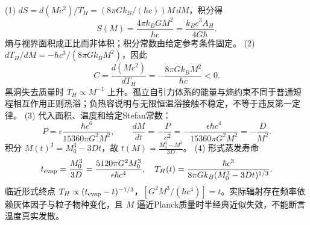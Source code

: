 (1) \(dS=d(Mc^2)/T_H=(8\pi Gk_B/(\hbar c))M\,dM\)，积分得
\[
S(M)=\frac{4\pi k_BG M^2}{\hbar c}
=\frac{k_Bc^3A_H}{4G\hbar}.
\]
熵与视界面积成正比而非体积；积分常数由给定参考条件固定。
(2) \(dT_H/dM=-\hbar c^3/(8\pi Gk_BM^2)\)，因此
\[
C=\frac{d(Mc^2)}{dT_H}=-\frac{8\pi Gk_BM^2}{\hbar c}<0.
\]
黑洞失去质量时 \(T_H\propto M^{-1}\) 上升。孤立自引力体系的能量与熵约束不同于普通短程相互作用正则热浴；负热容说明与无限恒温浴接触不稳定，不等于违反第一定律。
(3) 代入面积、温度和给定Stefan常数：
\[
P=\epsilon\frac{\hbar c^6}{15360\pi G^2M^2},\qquad
\frac{dM}{dt}=-\frac{P}{c^2}=-\frac{\epsilon\hbar c^4}{15360\pi G^2M^2}=-\frac{D}{M^2}.
\]
积分 \(M(t)^3=M_0^3-3Dt\)，故 \(t(M)=\frac{M_0^3-M^3}{3D}\)。
(4) 形式蒸发寿命
\[
t_{\rm evap}=\frac{M_0^3}{3D}=\frac{5120\pi G^2M_0^3}{\epsilon\hbar c^4},
\quad T_H(t)=\frac{\hbar c^3}{8\pi Gk_B(M_0^3-3Dt)^{1/3}}.
\]
临近形式终点 \(T_H\propto(t_{\rm evap}-t)^{-1/3}\)，\([G^2M^3/(\hbar c^4)]=t\)。实际辐射存在频率依赖灰体因子与粒子物种变化，且 \(M\) 逼近Planck质量时半经典近似失效，不能断言温度真实发散。
